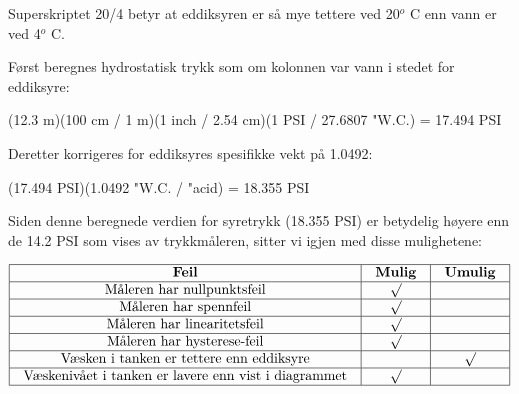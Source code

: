 





Superskriptet 20/4 betyr at eddiksyren er så mye tettere ved 20$^{o}$ C enn vann er ved 4$^{o}$ C.







Først beregnes hydrostatisk trykk som om kolonnen var vann i stedet for eddiksyre:

\vskip 10pt

(12.3 m)(100 cm / 1 m)(1 inch / 2.54 cm)(1 PSI / 27.6807 "W.C.) = 17.494 PSI

\vskip 10pt

Deretter korrigeres for eddiksyres spesifikke vekt på 1.0492:

\vskip 10pt

(17.494 PSI)(1.0492 "W.C. / "acid) = 18.355 PSI

\vskip 10pt

Siden denne beregnede verdien for syretrykk (18.355 PSI) er betydelig høyere enn de 14.2 PSI som vises av trykkmåleren, sitter vi igjen med disse mulighetene:

\vskip 10pt


$$\vbox{\offinterlineskip
\halign{\strut
\vrule \quad\hfil # \ \hfil & 
\vrule \quad\hfil # \ \hfil & 
\vrule \quad\hfil # \ \hfil \vrule \cr
\noalign{\hrule}
%
{\bf Feil} & {\bf Mulig} & {\bf Umulig} \cr
%
\noalign{\hrule}
%
Måleren har nullpunktsfeil & $\surd$ &  \cr
%
\noalign{\hrule}
%
Måleren har spennfeil & $\surd$ &  \cr
%
\noalign{\hrule}
%
Måleren har linearitetsfeil & $\surd$ &  \cr
%
\noalign{\hrule}
%
Måleren har hysterese-feil & $\surd$ &  \cr
%
\noalign{\hrule}
%
Væsken i tanken er tettere enn eddiksyre &  & $\surd$ \cr
%
\noalign{\hrule}
%
Væskenivået i tanken er lavere enn vist i diagrammet & $\surd$ &  \cr
%
\noalign{\hrule}
} %
}$$ %



